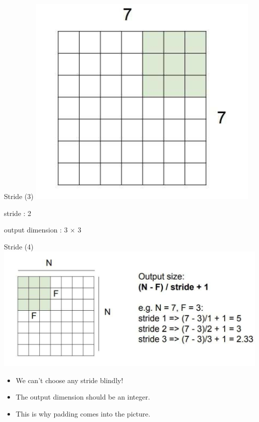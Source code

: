\documentclass[serif, aspectratio=169]{beamer}
\begin{document}
\begin{frame}{Stride (3)}
		\includegraphics[keepaspectratio, scale=0.5]{pic/stride23.png}
		
		\smallskip	
		\begin{itemsize}
			\item stride : 2
			\item output dimension : 3 $\times$ 3
		\end{itemsize}
	\end{frame}
	\begin{frame}{Stride (4)}
		\centering
		\includegraphics[keepaspectratio, scale=0.5]{pic/strideComp.png}
	\smallskip		
	\begin{itemize}
		\item We can't choose any stride blindly!
		\item The output dimension should be an integer.
		\item This is why padding comes into the picture.
	\end{itemize}

	\end{frame}
\end{document}
